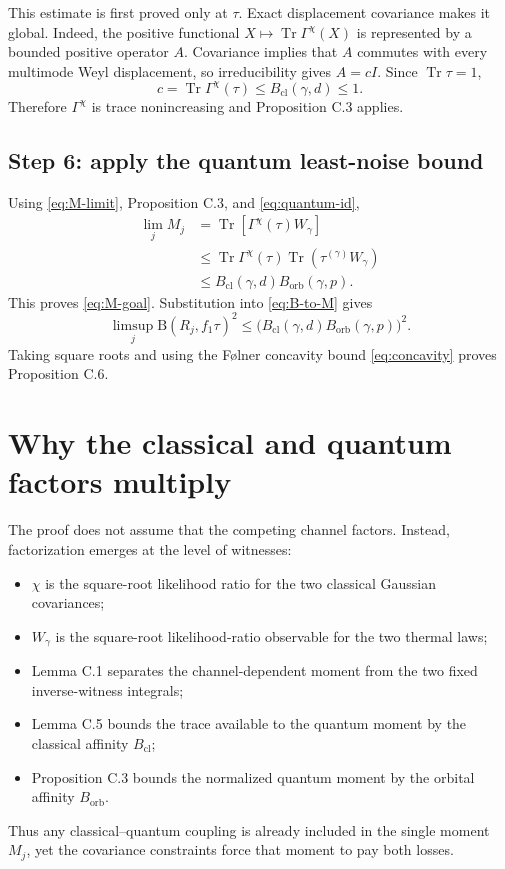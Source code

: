 \documentclass[11pt]{article}
\newcommand{\Tr}{\operatorname{Tr}}
\newcommand{\B}{\mathrm B}
\newcommand{\Bcl}{B_{\mathrm{cl}}}
\newcommand{\Borb}{B_{\mathrm{orb}}}
\begin{document}
This estimate is first proved only at $\tau$.  Exact displacement covariance
makes it global.  Indeed, the positive functional
$X\mapsto\Tr\Gamma^\chi(X)$ is represented by a bounded positive operator
$A$.  Covariance implies that $A$ commutes with every multimode Weyl
displacement, so irreducibility gives $A=cI$.  Since $\Tr\tau=1$,
\[
  c=\Tr\Gamma^\chi(\tau)\leq\Bcl(\gamma,d)\leq1.
\]
Therefore $\Gamma^\chi$ is trace nonincreasing and Proposition C.3 applies.

\subsection*{Step 6: apply the quantum least-noise bound}

Using \eqref{eq:M-limit}, Proposition C.3, and
\eqref{eq:quantum-id},
\begin{align*}
  \lim_j M_j
  &=\Tr[\Gamma^\chi(\tau)W_\gamma]\\
  &\leq\Tr\Gamma^\chi(\tau)
    \Tr(\tau^{(\gamma)}W_\gamma)\\
  &\leq\Bcl(\gamma,d)\Borb(\gamma,p).
\end{align*}
This proves \eqref{eq:M-goal}.  Substitution into \eqref{eq:B-to-M} gives
\[
  \limsup_j\B(R_j,f_1\tau)^2
  \leq
  \bigl(\Bcl(\gamma,d)\Borb(\gamma,p)\bigr)^2.
\]
Taking square roots and using the F\o lner concavity bound
\eqref{eq:concavity} proves Proposition C.6.

\section{Why the classical and quantum factors multiply}

The proof does not assume that the competing channel factors.  Instead,
factorization emerges at the level of witnesses:
\begin{itemize}
  \item $\chi$ is the square-root likelihood ratio for the two classical
  Gaussian covariances;
  \item $W_\gamma$ is the square-root likelihood-ratio observable for the two
  thermal laws;
  \item Lemma C.1 separates the channel-dependent moment from the two fixed
  inverse-witness integrals;
  \item Lemma C.5 bounds the trace available to the quantum moment by the
  classical affinity $\Bcl$;
  \item Proposition C.3 bounds the normalized quantum moment by the orbital
  affinity $\Borb$.
\end{itemize}
Thus any classical--quantum coupling is already included in the single
moment $M_j$, yet the covariance constraints force that moment to pay both
losses.
\end{document}
